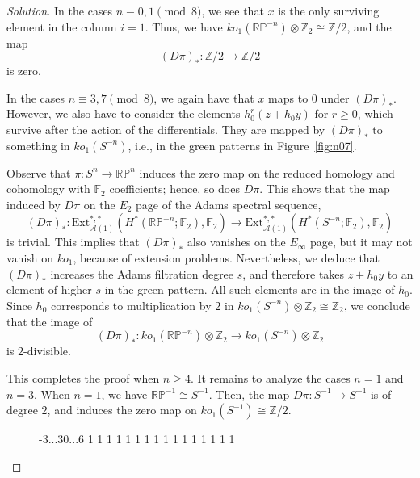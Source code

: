\documentclass{amsart}
\def\RP{\mathbb{RP}}
\newcommand{\from}{\colon}
\newcommand{\Ext}{\mathrm{Ext}}
\newcommand{\Steenrod}{\mathcal{A}}
\newcommand{\Aone}{\Steenrod(1)}
\newcommand{\FF}{\mathbb{F}}
\newcommand{\ZZ}{\mathbb{Z}}
\begin{document}
\begin{proof}[Solution]
In the cases $n \equiv 0,1\!\!\pmod 8$, we see that $x$ is the only surviving element in the column $i=1$. Thus, we have $ ko_1(\RP^{-n})  \otimes \ZZ_2 \cong \ZZ/2$, and the map 
\[
  (D\pi)_*\from \ZZ/2 \to \ZZ/2
\]
is zero.

In the cases $n \equiv 3,7\!\!\pmod 8$, we again have that $x$ maps to $0$ under $(D\pi)_*$. However, we also have to consider the elements $h_0^r(z + h_0 y)$ for $r \geq 0$, which survive after the action of the differentials. They are mapped by $(D\pi)_*$ to something in $ko_1(S^{-n})$, i.e., in the green patterns in Figure~\ref{fig:n07}. 

Observe that $\pi\from S^n \to \RP^n$ induces the zero map on the reduced homology and cohomology with $\FF_2$ coefficients; hence, so does $D\pi$. This shows that the map induced by $D\pi$ on the $E_2$ page of the Adams spectral sequence,
\[
  (D\pi)_*\from \Ext^{*,*}_{\Aone}(H^*(\RP^{-n};\FF_2),\FF_2) \to \Ext^{*,*}_{\Aone}(H^*(S^{-n};\FF_2),\FF_2)
\]
is trivial. This implies that $(D\pi)_*$ also vanishes on the $E_{\infty}$ page, but it may not vanish on $ko_1$, because of extension problems. Nevertheless, we deduce that $(D\pi)_*$ increases the Adams filtration degree $s$, and therefore takes $z + h_0 y$ to an element of higher $s$ in the green pattern. All such elements are in the image of $h_0$. Since $h_0$ corresponds to multiplication by $2$ in $ko_1(S^{-n})\otimes \ZZ_2 \cong \ZZ_2$, we conclude that the image of 
$$  (D\pi)_*\from ko_1(\RP^{-n}) \otimes \ZZ_2 \to ko_1(S^{-n}) \otimes \ZZ_2$$
is $2$-divisible. 

This completes the proof when $n \geq 4$. It remains to analyze the
cases $n=1$ and $n=3$. When $n=1$, we have $\RP^{-1} \cong
S^{-1}$. Then, the map $D\pi\from S^{-1} \to S^{-1}$ is of degree $2$,
and induces the zero map on $ko_{1}(S^{-1}) \cong \ZZ/2$.


\begin{figure}
   \centering
\begin{sseq}[entrysize=5mm, gridstroke=.05pt]{-3...3}{0...6}
\ssdropbull
{} 1
\ssdropbull \ssstroke[color=mygreen]
 1
\ssdropbull \ssstroke[color=mygreen]
 1
\ssdropbull \ssstroke[color=mygreen]
 1
\ssdropbull \ssstroke[color=mygreen]
 1
\ssdropbull \ssstroke[color=mygreen]
 1
\ssdropbull \ssstroke[color=mygreen]
 1
\ssdropbull \ssstroke[color=mygreen]
 1
\ssdropbull \ssstroke[color=mygreen]
 1
\ssdropbull \ssstroke[color=mygreen]
\ssdropbull \ssstroke[color=mygreen]
\ssdropbull
{} 1 
\ssdropbull \ssstroke[color=mygreen]
 1
\ssdropbull {}
 1
\ssdropbull \ssstroke[color=mygreen]
 1
\ssdropbull \ssstroke[color=mygreen]
 1
\ssdropbull \ssstroke[color=mygreen]
 1
\ssdropbull \ssstroke[color=mygreen]
 1
\ssdropbull \ssstroke[color=mygreen]
\ssdropbull \ssstroke[color=mygreen]


\end{sseq}
\end{figure}
\end{proof}
\end{document}
